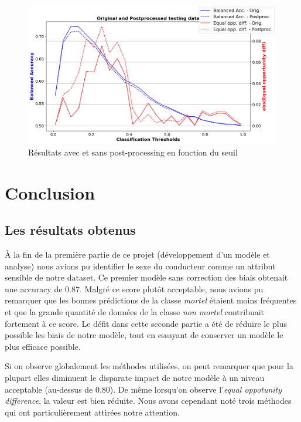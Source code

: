 \documentclass{article}
\begin{document}
    \begin{figure}[h]
        \centering
        \includegraphics[width=\textwidth]{./img/cal_equ_odds.png}
        \caption{Résultats avec et sans post-processing en fonction du seuil}
        \label{fig:EQU_odds}
    \end{figure}
    \vspace{3cm}

    
    \section{Conclusion}

    \subsection{Les résultats obtenus}
    À la fin de la première partie de ce projet (développement d'un modèle et analyse) nous avions pu 
    identifier le sexe du conducteur comme un attribut sensible de notre dataset. Ce premier modèle 
    sans correction des biais obtenait une accuracy de $0.87$. Malgré ce score plutôt acceptable, nous 
    avions pu remarquer que les bonnes prédictions de la classe \textit{mortel} étaient moins fréquentes et 
    que la grande quantité de données de la classe \textit{non mortel} contribuait fortement à ce score. 
    Le défit dans cette seconde partie a été de réduire le plus possible les biais de notre modèle, tout 
    en essayant de conserver un modèle le plus efficace possible.

    Si on observe globalement les méthodes utilisées, on peut remarquer que pour la plupart elles 
    diminuent le disparate impact de notre modèle à un niveau acceptable (au-dessus de 0.80). De même lorsqu'on 
    observe l'\textit{equal oppotunity difference}, la valeur est bien réduite. 
    Nous avons cependant noté trois méthodes qui ont particulièrement attirées notre attention.
\end{document}
